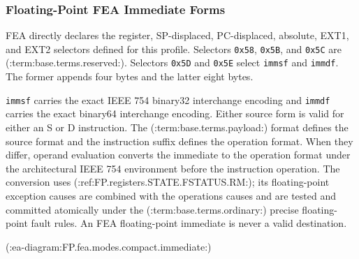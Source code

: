 \subsubsection{Floating-Point FEA Immediate Forms}
FEA directly declares the register, SP-displaced, PC-displaced, absolute, EXT1, and EXT2 selectors defined for
this profile. Selectors \texttt{0x58}, \texttt{0x5B}, and \texttt{0x5C} are
(:term:base.terms.reserved:). Selectors \texttt{0x5D} and \texttt{0x5E} select \texttt{immsf} and \texttt{immdf}.
The former appends four bytes and the latter eight bytes.

\texttt{immsf} carries the exact IEEE 754 binary32 interchange encoding and \texttt{immdf} carries the exact
binary64 interchange encoding. Either source form is valid for either an S or D instruction. The (:term:base.terms.payload:) format
defines the source format and the instruction suffix defines the operation format. When they differ, operand
evaluation converts the immediate to the operation format under the architectural IEEE 754 environment before the
instruction operation. The conversion uses (:ref:FP.registers.STATE.FSTATUS.RM:); its floating-point exception causes are combined
with the operation\textquotesingle{}s causes and are tested and committed atomically under the (:term:base.terms.ordinary:) precise floating-point fault
rules. An FEA floating-point immediate is never a valid destination.

\clearpage
(:ea-diagram:FP.fea.modes.compact.immediate:)
